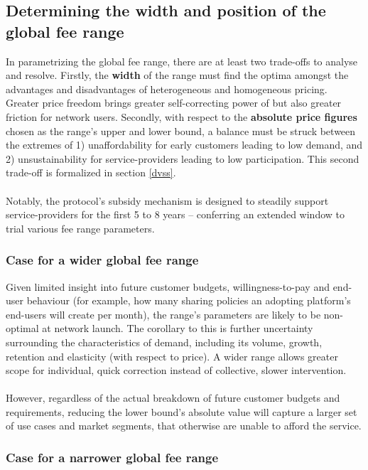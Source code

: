 \documentclass[longbibliography,nofootinbib]{revtex4-1}
\begin{document}
\subsection{Determining the width and position of the global fee range}

In parametrizing the global fee range, there are at least two trade-offs to analyse and resolve. Firstly, the \textbf{width} of the range must find the optima amongst the advantages and disadvantages of heterogeneous and homogeneous pricing. Greater price freedom brings greater self-correcting power of but also greater friction for network users. Secondly, with respect to the \textbf{absolute price figures} chosen as the range's upper and lower bound, a balance must be struck between the extremes of 1) unaffordability for early customers leading to low demand, and 2) unsustainability for service-providers leading to low participation. This second trade-off is formalized in section \ref{dvss}. 
\\\\
Notably, the protocol's subsidy mechanism is designed to steadily support service-providers for the first 5 to 8 years – conferring an extended window to trial various fee range parameters.

\subsubsection{Case for a wider global fee range}

Given limited insight into future customer budgets, willingness-to-pay and end-user behaviour (for example, how many sharing policies an adopting platform's end-users will create per month), the range's parameters are likely to be non-optimal at network launch. The corollary to this is further uncertainty surrounding the characteristics of demand, including its volume, growth, retention and elasticity (with respect to price). A wider range allows greater scope for individual, quick correction instead of collective, slower intervention.
\\\\
However, regardless of the actual breakdown of future customer budgets and requirements, reducing the lower bound’s absolute value will capture a larger set of use cases and market segments, that otherwise are unable to afford the service. 

\subsubsection{Case for a narrower global fee range}
\end{document}
